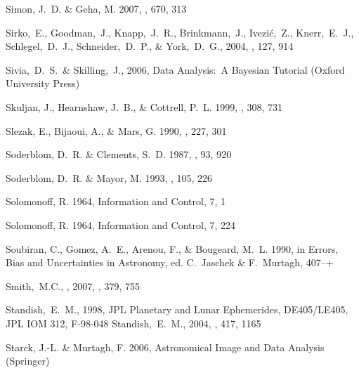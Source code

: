 \begin{thebibliography}{99}
{Simon}, J.~D. \& {Geha}, M. 2007, \apj, 670, 313

 Sirko,~E., Goodman,~J., Knapp,~J.~R., Brinkmann,~J., Ivezi\'{c},~Z., Knerr,~E.~J., Schlegel,~D.~J., Schneider,~D.~P., \& York,~D.~G., 2004,
  \aj, 127, 914

  Sivia,~D.~S.~\& Skilling,~J., 2006,
  Data Analysis:\ A Bayesian Tutorial (Oxford University Press)

{Skuljan}, J., {Hearnshaw}, J.~B., \& {Cottrell}, P.~L. 1999, \mnras, 308, 731

{Slezak}, E., {Bijaoui}, A., \& {Mars}, G. 1990, \aap, 227, 301

{Soderblom}, D.~R. \& {Clements}, S.~D. 1987, \aj, 93, 920

{Soderblom}, D.~R. \& {Mayor}, M. 1993, \aj, 105, 226

{Solomonoff}, R. 1964{}, {Information and Control}, 7, 1

{Solomonoff}, R. 1964{}, {Information and Control}, 7, 224

{Soubiran}, C., {Gomez}, A.~E., {Arenou}, F., \& {Bougeard}, M.~L. 1990, in
  Errors, Bias and Uncertainties in Astronomy, ed. C.~{Jaschek} \&
  F.~{Murtagh}, 407--+

 Smith,~M.C., \etal, 2007,
  \mnras, 379, 755

  Standish,~E.~M., 1998,
  JPL Planetary and Lunar Ephemerides, DE405/LE405,
  JPL IOM 312, F-98-048
  Standish,~E.~M., 2004,
  \aap, 417, 1165

{Starck}, J.-L. \& {Murtagh}, F. 2006, {Astronomical Image and Data Analysis}
  ({Springer})


\end{thebibliography}
